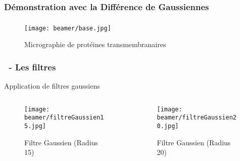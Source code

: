 \documentclass[11pt]{beamer}
\begin{document}
\subsubsection*{Démonstration avec la Différence de Gaussiennes}
\begin{frame}
\frametitle{\subsubsecname}%
			\begin{figure}
				\texttt{[image: beamer/base.jpg]}
	
				Micrographie de protéines transmembranaires
			\end{figure}
\end{frame}
\begin{frame}
\frametitle{\subsecname ~- Les filtres}
Application de filtres gaussiens
	\begin{columns}
		\begin{column}{5cm}
			\begin{figure}
				\texttt{[image: beamer/filtreGaussien15.jpg]}
				
				Filtre Gaussien (Radius 15)
			\end{figure}			
		\end{column}
		\begin{column}{5cm}
			\begin{figure}
				\texttt{[image: beamer/filtreGaussien20.jpg]}
				
				Filtre Gaussien (Radius 20)
			\end{figure}
		\end{column}
	\end{columns}
\end{frame}
\end{document}
